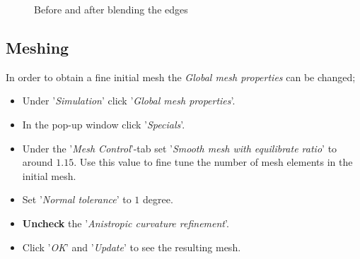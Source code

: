 \begin{figure}[h]
	\centering
	\qquad
	\caption{Before and after blending the edges}
	\label{fig:blending}
\end{figure}


\subsection{Meshing}
In order to obtain a fine initial mesh the \textit{Global mesh properties} can be changed;
\begin{itemize}
	\item Under '\textit{Simulation}' click '\textit{Global mesh properties}'.
	\item In the pop-up window click '\textit{Specials}'.
	\item Under the '\textit{Mesh Control}'-tab set '\textit{Smooth mesh with equilibrate ratio}' to around \(1.15\). Use this value to fine tune the number of mesh elements in the initial mesh.
	\item Set '\textit{Normal tolerance}' to \(1\) degree.
	\item \textbf{Uncheck} the '\textit{Anistropic curvature refinement}'. 
	\item Click '\textit{OK}' and '\textit{Update}' to see the resulting mesh. 
\end{itemize}

